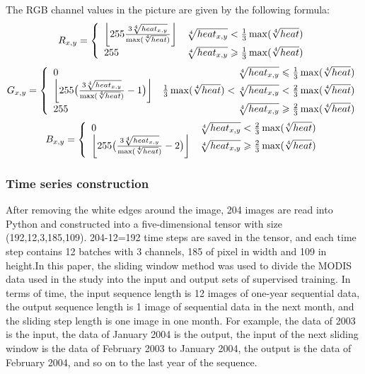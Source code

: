 \documentclass[../main]{subfiles}
\begin{document}
The RGB channel values in the picture are given by the following
formula:
\begin{equation}
R_{x,y}=\left\{
\begin{array}{lr}
\left \lfloor 255\frac{3\root4\of{{heat}_{x,y}}}{\max(\root4\of {heat})} \right \rfloor & \root4\of{{heat}_{x,y}}<\frac{1}{3}\max(\root4\of {heat})  \\  
255 & \root4\of{{heat}_{x,y}}\ge\frac{1}{3}\max(\root4\of {heat})
\end{array}  
\right.
\end{equation}
\begin{equation}
G_{x,y}=\left\{
\begin{array}{lr}
0&\root4\of{{heat}_{x,y}}\le\frac{1}{3}\max(\root4\of {heat})\\
\left \lfloor 255\big(\frac{3\root4\of{{heat}_{x,y}}}{\max(\root4\of {heat})}-1\big) \right \rfloor&\frac{1}{3}\max(\root4\of {heat})<\root4\of{{heat}_{x,y}}<\frac{2}{3}\max(\root4\of {heat})  \\  
255&\root4\of{{heat}_{x,y}}\ge\frac{2}{3}\max(\root4\of {heat})
\end{array}  
\right.
\end{equation}
\begin{equation}
B_{x,y}=\left\{
\begin{array}{lr}
0&\root4\of{{heat}_{x,y}}<\frac{2}{3}\max(\root4\of {heat})\\
\left \lfloor 255\big(\frac{3\root4\of{{heat}_{x,y}}}{\max(\root4\of {heat})}-2\big) \right \rfloor&\root4\of{{heat}_{x,y}}\ge\frac{2}{3}\max(\root4\of {heat})  
\end{array}  
\right.
\end{equation}
\hypertarget{time-series-construction}{%
\subsubsection{Time series
construction}\label{time-series-construction}}

After removing the white edges around the image, 204 images are read into Python and constructed into a five-dimensional tensor
with size (192,12,3,185,109). 204-12=192 time steps are saved in the tensor, and each time step contains 12 batches with 3 channels, 
185 of pixel in width and 109 in height.In this paper, the sliding window method\cite{7785326} was used to divide the MODIS 
data used in the study into the input and output sets of supervised training. In terms of time, the input sequence length is 12 images 
of one-year sequential data, the output sequence length is 1 image of sequential data in the next month, and the sliding step length is 
one image in one month. For example, the data of 2003 is the input, the data of January 2004 is the output, the input of the next sliding 
window is the data of February 2003 to January 2004, the output is the data of February 2004, and so on to the last year of the sequence.
\end{document}
